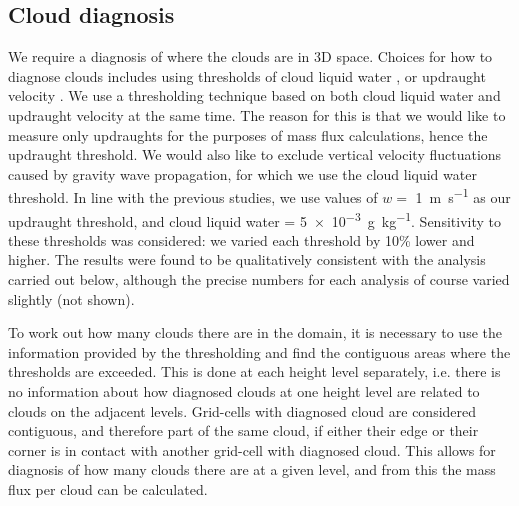 \documentclass[11pt,a4paper]{article}
\newcommand*\mean[1]{\overline{#1}}
\newcommand\todo[1]{\textbf{TODO: #1}}
\begin{document}
\subsection{Cloud diagnosis}
\label{subsec:cloud_diag}

We require a diagnosis of where the clouds are in 3D space. Choices for how to diagnose clouds includes using thresholds of cloud liquid water \parencite{CC2006II}, or updraught velocity \parencite{CC2006II, zipser1980cumulonimbus}. We use a thresholding technique based on both cloud liquid water and updraught velocity at the same time. The reason for this is that we would like to measure only updraughts for the purposes of mass flux calculations, hence the updraught threshold. We would also like to exclude vertical velocity fluctuations caused by gravity wave propagation, for which we use the cloud liquid water threshold. In line with the previous studies, we use values of $w =$ \SI{1}{m.s^{-1}} as our updraught threshold, and cloud liquid water = \SI{5e-3}{g.kg^{-1}}. Sensitivity to these thresholds was considered: we varied each threshold by 10\% lower and higher. The results were found to be qualitatively consistent with the analysis carried out below, although the precise numbers for each analysis of course varied slightly (not shown).

To work out how many clouds there are in the domain, it is necessary to use the information provided by the thresholding and find the contiguous areas where the thresholds are exceeded. This is done at each height level separately, i.e. there is no information about how diagnosed clouds at one height level are related to clouds on the adjacent levels. Grid-cells with diagnosed cloud are considered contiguous, and therefore part of the same cloud, if either their edge or their corner is in contact with another grid-cell with diagnosed cloud. This allows for diagnosis of how many clouds there are at a given level, and from this the mass flux per cloud can be calculated.
\end{document}
